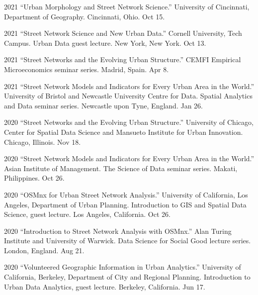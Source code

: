 \documentclass[12pt,letterpaper]{report}
\begin{document}
    \begin{tablist}


        \item[2021] \tab{}\enquote{Urban Morphology and Street Network Science.} University of Cincinnati, Department of Geography. Cincinnati, Ohio. Oct 15.

        \item[2021] \tab{}\enquote{Street Network Science and New Urban Data.} Cornell University, Tech Campus. Urban Data guest lecture. New York, New York. Oct 13.

        \item[2021] \tab{}\enquote{Street Networks and the Evolving Urban Structure.} CEMFI Empirical Microeconomics seminar series. Madrid, Spain. Apr 8.

        \item[2021] \tab{}\enquote{Street Network Models and Indicators for Every Urban Area in the World.} University of Bristol and Newcastle University Centre for Data. Spatial Analytics and Data seminar series. Newcastle upon Tyne, England. Jan 26.

        \item[2020] \tab{}\enquote{Street Networks and the Evolving Urban Structure.} University of Chicago, Center for Spatial Data Science and Mansueto Institute for Urban Innovation. Chicago, Illinois. Nov 18.

        \item[2020] \tab{}\enquote{Street Network Models and Indicators for Every Urban Area in the World.} Asian Institute of Management. The Science of Data seminar series. Makati, Philippines. Oct 26.

        \item[2020] \tab{}\enquote{OSMnx for Urban Street Network Analysis.} University of California, Los Angeles, Department of Urban Planning. Introduction to GIS and Spatial Data Science, guest lecture. Los Angeles, California. Oct 26.

        \item[2020] \tab{}\enquote{Introduction to Street Network Analysis with OSMnx.} Alan Turing Institute and University of Warwick. Data Science for Social Good lecture series. London, England. Aug 21.

        \item[2020] \tab{}\enquote{Volunteered Geographic Information in Urban Analytics.} University of California, Berkeley, Department of City and Regional Planning. Introduction to Urban Data Analytics, guest lecture. Berkeley, California. Jun 17.


\end{tablist}
\end{document}
